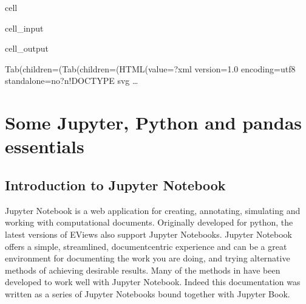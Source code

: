 \documentclass[letterpaper,10pt,english]{jupyterBook}
\begin{document}
\begin{sphinxuseclass}{cell}\begin{sphinxVerbatimInput}

\begin{sphinxuseclass}{cell_input}
\begin{sphinxVerbatim}[commandchars=\\\{\}]
\PYG{p}{[}\PYG{p}{]}
\end{sphinxVerbatim}

\end{sphinxuseclass}\end{sphinxVerbatimInput}
\begin{sphinxVerbatimOutput}

\begin{sphinxuseclass}{cell_output}
\begin{sphinxVerbatim}[commandchars=\\\{\}]
Tab(children=(Tab(children=(HTML(value=\PYGZsq{}\PYGZlt{}?xml version=\PYGZdq{}1.0\PYGZdq{} encoding=\PYGZdq{}utf\PYGZhy{}8\PYGZdq{} standalone=\PYGZdq{}no\PYGZdq{}?\PYGZgt{}\PYGZbs{}n\PYGZlt{}!DOCTYPE svg …
\end{sphinxVerbatim}

\begin{sphinxVerbatim}[commandchars=\\\{\}]

\end{sphinxVerbatim}

\end{sphinxuseclass}\end{sphinxVerbatimOutput}

\end{sphinxuseclass}
\sphinxstepscope


\part{Some Jupyter, Python and pandas essentials}

\sphinxstepscope


\chapter{Introduction to  Jupyter Notebook}
\label{\detokenize{content/04_PythonEssentials/Intro_Jupyter_notebook:introduction-to-jupyter-notebook}}\label{\detokenize{content/04_PythonEssentials/Intro_Jupyter_notebook::doc}}
\sphinxAtStartPar
Jupyter Notebook is a web application for creating, annotating, simulating and working with computational documents.  Originally developed for python, the latest versions of EViews also support Jupyter Notebooks. Jupyter Notebook offers a simple, streamlined, document\sphinxhyphen{}centric experience and can be a great environment for documenting the work you are doing, and trying alternative methods of achieving desirable results.  Many of the methods in  have been developed to work well with Jupyter Notebook. Indeed this documentation was written as a series of Jupyter Notebooks bound together with Jupyter Book.
\end{document}
